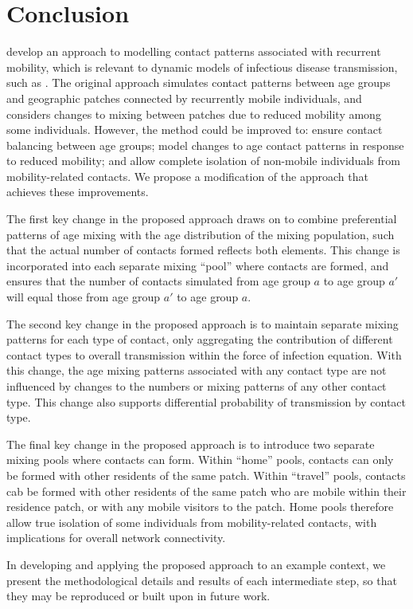 \section{Conclusion}\label{conc}
\citet{Arenas2020} develop an approach to modelling
contact patterns associated with recurrent mobility,
which is relevant to dynamic models of infectious disease transmission, such as \covid.
The original approach simulates contact patterns between
age groups and geographic patches connected by recurrently mobile individuals,
and considers changes to mixing between patches due to reduced mobility among some individuals.
However, the method could be improved to:
ensure contact balancing between age groups;
model changes to age contact patterns in response to reduced mobility; and
allow complete isolation of non-mobile individuals from mobility-related contacts.
We propose a modification of the approach that achieves these improvements.
\par
The first key change in the proposed approach draws on \cite{Arregui2018} to
combine preferential patterns of age mixing with the age distribution of the mixing population,
such that the actual number of contacts formed reflects both elements.
This change is incorporated into each separate mixing ``pool'' where contacts are formed,
and ensures that the number of contacts simulated from age group $a$ to age group $a'$
will equal those from age group $a'$ to age group $a$.
\par
The second key change in the proposed approach is to
maintain separate mixing patterns for each type of contact,
only aggregating the contribution of different contact types to overall transmission
within the force of infection equation.
With this change, the age mixing patterns associated with any contact type
are not influenced by changes to the numbers or mixing patterns of any other contact type.
This change also supports differential probability of transmission by contact type.
\par
The final key change in the proposed approach is to
introduce two separate mixing pools where contacts can form.
Within ``home'' pools, contacts can only be formed with other residents of the same patch.
Within ``travel'' pools, contacts cab be formed with other residents of the same patch
who are mobile within their residence patch, or with any mobile visitors to the patch.
Home pools therefore allow true isolation of some individuals from mobility-related contacts,
with implications for overall network connectivity.
\par
In developing and applying the proposed approach to an example context,
we present the methodological details and results of each intermediate step,
so that they may be reproduced or built upon in future work.
